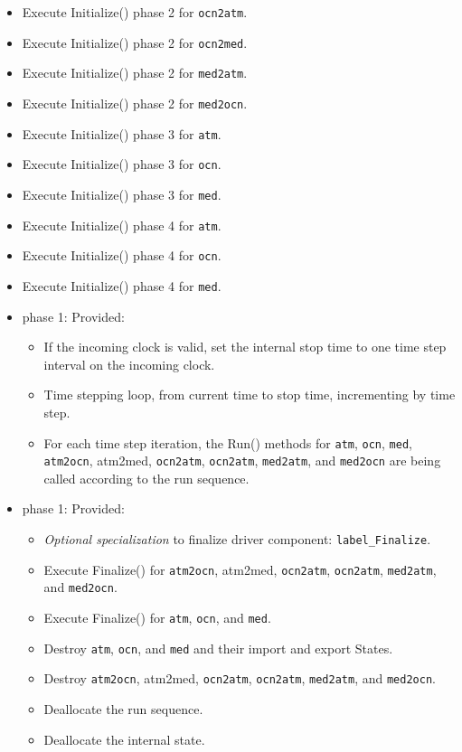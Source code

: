 \begin{itemize}
\begin{itemize}
  \item Execute Initialize() phase 2 for {\tt ocn2atm}.
  \item Execute Initialize() phase 2 for {\tt ocn2med}.
  \item Execute Initialize() phase 2 for {\tt med2atm}.
  \item Execute Initialize() phase 2 for {\tt med2ocn}.
  \item Execute Initialize() phase 3 for {\tt atm}.
  \item Execute Initialize() phase 3 for {\tt ocn}.
  \item Execute Initialize() phase 3 for {\tt med}.
  \item Execute Initialize() phase 4 for {\tt atm}.
  \item Execute Initialize() phase 4 for {\tt ocn}.
  \item Execute Initialize() phase 4 for {\tt med}.
  \end{itemize}  
\end{itemize}

\begin{itemize}
\item phase 1: {\sc Provided:}
  \begin{itemize}
  \item If the incoming clock is valid, set the internal stop time to one time step interval on the incoming clock.
  \item Time stepping loop, from current time to stop time, incrementing by time step.
  \item For each time step iteration, the Run() methods for {\tt atm}, {\tt ocn}, {\tt med}, {\tt atm2ocn}, {atm2med}, {\tt ocn2atm}, {\tt ocn2atm}, {\tt med2atm}, and {\tt med2ocn} are being called according to the run sequence.
  \end{itemize}    
\end{itemize}

\begin{itemize}
\item phase 1: {\sc Provided:}
  \begin{itemize}
  \item {\it Optional specialization} to finalize driver component: {\tt label\_Finalize}.
  \item Execute Finalize() for {\tt atm2ocn}, {atm2med}, {\tt ocn2atm}, {\tt ocn2atm}, {\tt med2atm}, and {\tt med2ocn}.
  \item Execute Finalize() for {\tt atm}, {\tt ocn}, and {\tt med}.
  \item Destroy {\tt atm}, {\tt ocn}, and {\tt med} and their import and export States.
  \item Destroy {\tt atm2ocn}, {atm2med}, {\tt ocn2atm}, {\tt ocn2atm}, {\tt med2atm}, and {\tt med2ocn}.
  \item Deallocate the run sequence.
  \item Deallocate the internal state.
  \end{itemize}      
\end{itemize}

